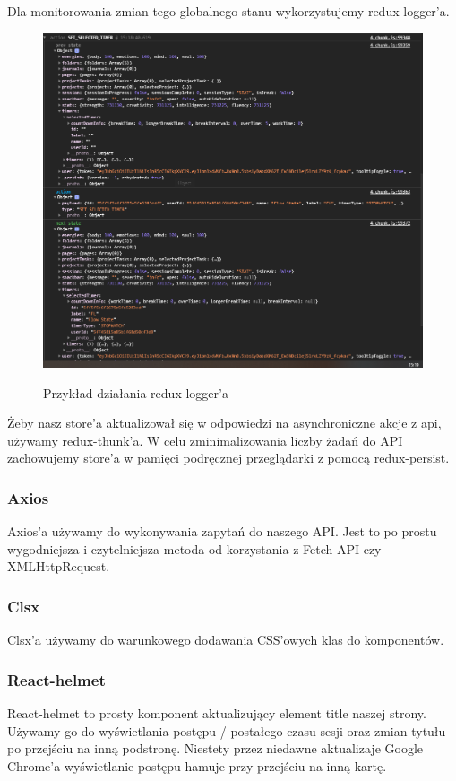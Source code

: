 \documentclass[a4paper,11pt]{report}
\begin{document}
Dla monitorowania zmian tego globalnego stanu wykorzystujemy redux-logger'a\cite{redux-logger}.
\begin{figure}[H]
	\centering
	\includegraphics[scale=0.4]{implementacja/frontend/redux_logger}\\
	\caption{Przykład działania redux-logger'a}
	\label{fig:redux_logger}
\end{figure}
Żeby nasz store'a aktualizował się w odpowiedzi na asynchroniczne akcje z api, używamy redux-thunk'a\cite{redux-thunk}.
W celu zminimalizowania liczby żadań do API zachowujemy store'a w pamięci podręcznej przeglądarki z pomocą redux-persist\cite{redux-persist}.

\subsubsection{Axios}
Axios'a\cite{axios} używamy do wykonywania zapytań do naszego API.
 Jest to po prostu wygodniejsza i czytelniejsza metoda od korzystania z Fetch API czy XMLHttpRequest.
\subsubsection{Clsx}
Clsx'a\cite{clsx} używamy do warunkowego dodawania CSS'owych klas do komponentów.

\subsubsection{React-helmet}
React-helmet\cite{react-helmet} to prosty komponent aktualizujący element title naszej strony.
 Używamy go do wyświetlania postępu / postałego czasu sesji oraz zmian tytułu po przejściu na inną podstronę.
 Niestety przez niedawne aktualizaje Google Chrome'a wyświetlanie postępu hamuje przy przejściu na inną kartę.
\end{document}
